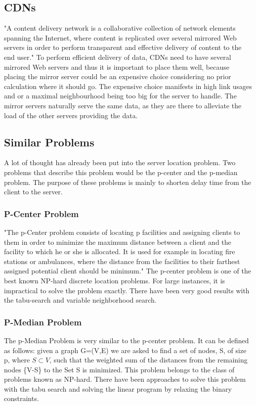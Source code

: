 \documentclass [12pt]{article}
\begin{document}
    \subsection {CDNs}
        "A content delivery network is a collaborative collection of network elements spanning
        the Internet, where content is replicated over several mirrored Web servers in order
        to perform transparent and effective delivery of content to the end user."\cite[p. 3]{Buyya:2008:CDN:1457653}
        To perform efficient delivery of data, CDNs need to have several mirrored Web servers
        and thus it is important to place them well, because placing the mirror server 
        could be an expensive choice considering no prior calculation where it should go. 
        The expensive choice manifests in high link usages and or a maximal neighbourhood being
        too big for the server to handle.
        The mirror servers naturally serve the same data, as they are there to alleviate the 
        load of the other servers providing the data.
        
    \subsection {Similar Problems}
    A lot of thought has already been put into the server location problem.
    Two problems that describe this problem would be the p-center and the
    p-median problem. The purpose of these problems is mainly to shorten delay
    time from the client to the server. 
    \subsubsection {P-Center Problem}
    "The p-Center problem consists of locating p facilities and assigning clients
    to them in order to minimize the maximum distance between a client and the facility
    to which he or she is allocated. It is used for example in locating fire stations or ambulances,
    where the distance from the facilities 
    to their farthest assigned potential client should be minimum."\cite{Mladenovic00solvingthe}
    The p-center problem is one of the best known NP-hard discrete location problems.\cite{KarivHakimi1979}
    For large instances, it is impractical to solve the problem exactly.
    There have been very good results with the tabu-search and variable neighborhood search.
    \cite{Mladenovic00solvingthe}
    \subsubsection {P-Median Problem}
    The p-Median Problem is very similar to the p-center problem. It can be defined as follows:
    given a graph G=(V,E) we are asked to find a set of nodes, S, of size p, where $ S\subset V$, such that the weighted
    sum of the distances from the remaining nodes \{V-S\} to the Set S is minimized. \cite{Rolland1997329}
    This problem belongs to the class of problems known as NP-hard.\cite{KarivHakimi1979median} There have been
    approaches to solve this problem with the tabu search \cite{Rolland1997329} and solving the linear program by
    relaxing the binary constraints.\cite{rosing1979p}
    
\end{document}
